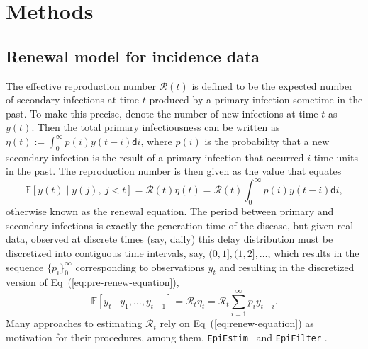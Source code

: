 \documentclass[10pt,letterpaper]{article}
\def\EpiEstim{\texttt{EpiEstim}}
\def\bbE{\mathbb{E}}
\def\calR{\mathcal{R}}
\def\diff{\mathsf{d}}
\newcommand{\citep}[1]{\cite{#1}}
\renewcommand{\eqref}[1]{Eq~(\ref{#1})}
\begin{document}
\section{Methods}

\subsection{Renewal model for incidence data} 

The effective reproduction number $\calR(t)$ is defined to be the expected
number of secondary infections at time $t$ produced by a primary infection
sometime in the past. To make this precise, denote the number of new infections
at time $t$ as $y(t)$. Then the total primary infectiousness can be written as
$\eta(t) := \int_0^{\infty} p(i) y(t-i) \diff i$, where $p(i)$ is the
probability that a new secondary infection is the result of a primary infection
that occurred $i$ time units in the past. The reproduction number is then given
as the value that equates
\begin{equation} \label{eq:pre-renew-equation}
  \bbE[y(t) \mid y(j),\ j<t]=\calR(t)\eta(t)=\calR(t)\int_0^\infty p(i)y(t-i)\diff i,
\end{equation}
otherwise known as the renewal equation. The period between primary and secondary
infections is exactly the generation time of the disease, but given real data,
observed at discrete times (say, daily) this delay distribution must be discretized
into contiguous time intervals,
say, $(0,1], (1,2], \dots$, which results in the sequence $\{p_i\}_0^\infty$
corresponding to observations $y_t$ and resulting in the
discretized version of \eqref{eq:pre-renew-equation},
\begin{equation} \label{eq:renew-equation}
  \bbE[y_t \mid y_1,\ldots,y_{t-1}]=\calR_t\eta_t=\calR_t\sum_{i = 1}^\infty p_i y_{t-i}.
\end{equation}
Many approaches to estimating $\calR_t$ rely on \eqref{eq:renew-equation} as
motivation for their procedures, among them, \EpiEstim\ \citep{cori2013new} 
and \texttt{EpiFilter} \citep{parag2021improved}. 
\end{document}
